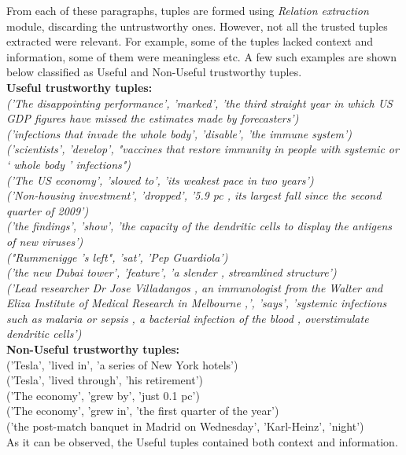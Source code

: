 \documentclass{article}
\begin{document}
From each of these paragraphs, tuples are formed using \textit{Relation extraction} module, discarding the untrustworthy ones. However, not all the trusted tuples extracted were relevant. For example, some of the tuples lacked context and information, some of them were meaningless etc. A few such examples are shown below classified as Useful and Non-Useful trustworthy tuples.\\
\textbf{Useful trustworthy tuples:}\\
\textit{
('The disappointing performance', 'marked', 'the third straight year in which US GDP figures have missed the estimates made by forecasters')\\
('infections that invade the whole body', 'disable', 'the immune system')\\
('scientists', 'develop', "vaccines that restore immunity in people with systemic or ` whole body ' infections")\\
('The US economy', 'slowed to', 'its weakest pace in two years')\\
('Non-housing investment', 'dropped', '5.9 pc , its largest fall since the second quarter of 2009')\\
('the findings', 'show', 'the capacity of the dendritic cells to display the antigens of new viruses')\\
("Rummenigge 's left", 'sat', 'Pep Guardiola')\\
('the new Dubai tower', 'feature', 'a slender , streamlined structure')
\\
('Lead researcher Dr Jose Villadangos , an immunologist from the Walter and Eliza Institute of Medical Research in Melbourne ,', 'says', 'systemic infections such as malaria or sepsis , a bacterial infection of the blood , overstimulate dendritic cells')
}\\
\textbf{Non-Useful trustworthy tuples:}\\
('Tesla', 'lived in', 'a series of New York hotels')\\
('Tesla', 'lived through', 'his retirement')\\
('The economy', 'grew by', 'just 0.1 pc')\\
('The economy', 'grew in', 'the first quarter of the year')\\
('the post-match banquet in Madrid on Wednesday', 'Karl-Heinz', 'night')\\

As it can be observed, the Useful tuples contained both context and information.
\end{document}
